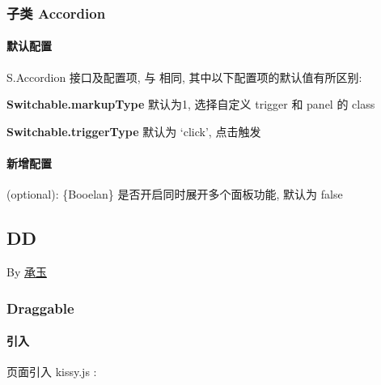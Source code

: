 \documentclass[letterpaper,10pt,english]{sphinxmanual}
\begin{document}
\subsubsection{子类 Accordion}
\label{api/component/switchable/accordion::doc}\label{api/component/switchable/accordion:accordion}

\paragraph{默认配置}
\label{api/component/switchable/accordion:id1}
S.Accordion 接口及配置项, 与 {\hyperref[api/component/switchable/switchable:Switchable.Switchable]{}} 相同, 其中以下配置项的默认值有所区别:

\textbf{Switchable.markupType}    默认为1, 选择自定义 trigger 和 panel 的 class

\textbf{Switchable.triggerType}    默认为 `click', 点击触发


\paragraph{新增配置}
\label{api/component/switchable/accordion:id2}

\begin{fulllineitems}
\label{api/component/switchable/accordion:Switchable.Accordion.multiple}
(optional): \{Booelan\} 是否开启同时展开多个面板功能, 默认为 false

\end{fulllineitems}

\label{api/component/dd/index:module-DD}

\subsection{DD}
\label{api/component/dd/index:dd}\label{api/component/dd/index::doc}
By \href{mailto:yiminghe@gmail.com}{承玉}


\subsubsection{Draggable}
\label{api/component/dd/draggable:draggable}\label{api/component/dd/draggable::doc}

\paragraph{引入}
\label{api/component/dd/draggable:id1}
页面引入 kissy.js :
\end{document}
